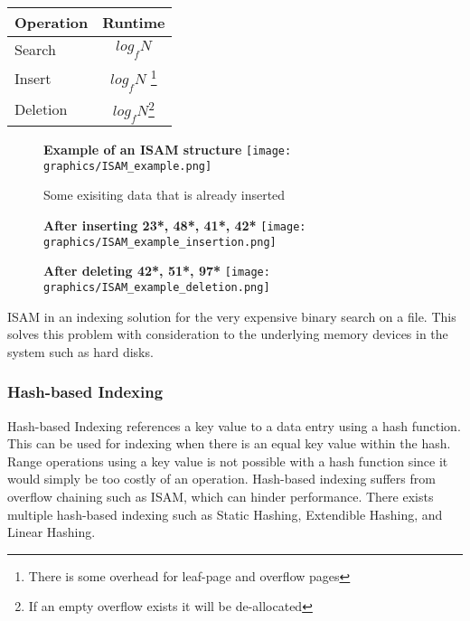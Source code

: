 \documentclass[letterpaper, 12pt]{article}
\begin{document}
\begin{center}
\begin{tabular}{l | c}
  \hline
  Operation & Runtime \\ \hline \hline
  Search & $ log_f N $ \\ \hline
  Insert & $ log_f N $ \footnote{There is some overhead for leaf-page and overflow pages} \\ \hline
  Deletion & $ log_f N $\footnote{If an empty overflow exists it will be de-allocated} \\ \hline
\end{tabular}
\end{center}

\begin{figure}
  \centering
  \textbf{Example of an ISAM structure}
  \texttt{[image: graphics/ISAM\_example.png]}
  \cite{ramakrishnan2000database}
  \caption{Some exisiting data that is already inserted}
\end{figure}

\begin{figure}
  \centering
  \textbf{After inserting 23*, 48*, 41*, 42*}
  \texttt{[image: graphics/ISAM\_example\_insertion.png]}
  \cite{ramakrishnan2000database}
\end{figure}

\begin{figure}
  \centering
  \textbf{After deleting 42*, 51*, 97*}
  \texttt{[image: graphics/ISAM\_example\_deletion.png]}
  \cite{ramakrishnan2000database}
\end{figure}

\par\vspace{\baselineskip}

ISAM in an indexing solution for the very expensive binary search on a file. This solves this
problem with consideration to the underlying memory devices in the system such as hard disks.

\subsubsection{Hash-based Indexing}
Hash-based Indexing references a key value to a data entry using a hash function. This can be
used for indexing when there is an equal key value within the hash. Range operations using
a key value is not possible with a hash function since it would simply be too costly of an
operation. Hash-based indexing suffers from overflow chaining such as ISAM, which can hinder
performance. There exists multiple hash-based indexing such as Static Hashing, Extendible Hashing,
and Linear Hashing.
\end{document}

